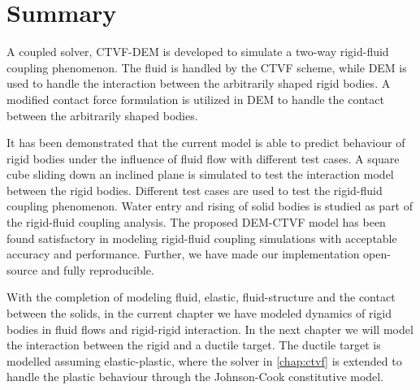 

\FloatBarrier%
\section{Summary}
\label{sec:Summary}
A coupled solver, CTVF-DEM is developed to simulate a two-way rigid-fluid
coupling phenomenon. The fluid is handled by the CTVF scheme, while DEM is
used to handle the interaction between the arbitrarily shaped rigid bodies. A
modified contact force formulation is utilized in DEM to handle the contact
between the arbitrarily shaped bodies.

It has been demonstrated that the current model is able to predict behaviour of
rigid bodies under the influence of fluid flow with different test cases. A
square cube sliding down an inclined plane is simulated to test the interaction
model between the rigid bodies. Different test cases are used to test the
rigid-fluid coupling phenomenon. Water entry and rising of solid bodies is
studied as part of the rigid-fluid coupling analysis.
The proposed DEM-CTVF model has been found satisfactory in modeling rigid-fluid
coupling simulations with acceptable accuracy and performance. Further, we have
made our implementation open-source and fully reproducible.

With the completion of modeling fluid, elastic, fluid-structure and the contact
between the solids, in the current chapter we have modeled dynamics of rigid
bodies in fluid flows and rigid-rigid interaction. In the next chapter we will
model the interaction between the rigid and a ductile target. The ductile target
is modelled assuming elastic-plastic, where the solver in \cref{chap:ctvf} is
extended to handle the plastic behaviour through the Johnson-Cook constitutive
model.

